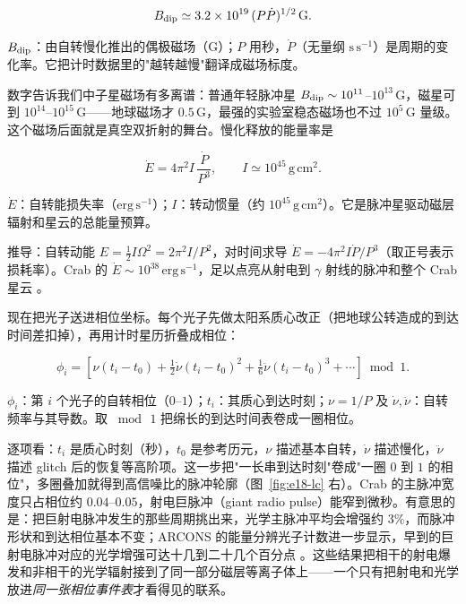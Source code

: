 \begin{equation}
  B_{\rm dip}\simeq 3.2\times10^{19}\,(P\dot P)^{1/2}\,\mathrm{G}.
  \label{eq:e18-bdip}
\end{equation}
\begin{formulaexplain}
\(B_{\rm dip}\)：由自转慢化推出的偶极磁场（\(\mathrm{G}\)）；\(P\) 用秒，\(\dot P\)（无量纲 \(\mathrm{s\,s^{-1}}\)）是周期的变化率。它把计时数据里的"越转越慢"翻译成磁场标度。
\end{formulaexplain}

数字告诉我们中子星磁场有多离谱：普通年轻脉冲星 \(B_{\rm dip}\sim10^{11}\)–\(10^{13}\,\mathrm{G}\)，磁星可到 \(10^{14}\)–\(10^{15}\,\mathrm{G}\)——地球磁场才 \(0.5\,\mathrm{G}\)，最强的实验室稳态磁场也不过 \(10^5\,\mathrm{G}\) 量级。这个磁场后面就是真空双折射的舞台。慢化释放的能量率是

\begin{equation}
  \dot E = 4\pi^2 I\,\frac{\dot P}{P^3},
  \qquad
  I\simeq10^{45}\,\mathrm{g\,cm^2}.
  \label{eq:e18-edot}
\end{equation}
\begin{formulaexplain}
\(\dot E\)：自转能损失率（\(\mathrm{erg\,s^{-1}}\)）；\(I\)：转动惯量（约 \(10^{45}\,\mathrm{g\,cm^2}\)）。它是脉冲星驱动磁层辐射和星云的总能量预算。
\end{formulaexplain}

推导：自转动能 \(E=\tfrac12 I\Omega^2=2\pi^2 I/P^2\)，对时间求导 \(\dot E=-4\pi^2 I\dot P/P^3\)（取正号表示损耗率）。Crab 的 \(\dot E\sim10^{38}\,\mathrm{erg\,s^{-1}}\)，足以点亮从射电到 \(\gamma\) 射线的脉冲和整个 Crab 星云 \citep{1984ApJ...283..279H,1992ApJ...397..187B,2001A&A...378..918K,2008ApJ...680.1378H}。

现在把光子送进相位坐标。每个光子先做太阳系质心改正（把地球公转造成的到达时间差扣掉），再用计时星历折叠成相位：

\begin{equation}
  \phi_i=
  \left[
  \nu(t_i-t_0)+\tfrac12\dot\nu(t_i-t_0)^2
  +\tfrac16\ddot\nu(t_i-t_0)^3+\cdots
  \right]\bmod 1 .
  \label{eq:e18-fold}
\end{equation}
\begin{formulaexplain}
\(\phi_i\)：第 \(i\) 个光子的自转相位（\(0\)–\(1\)）；\(t_i\)：其质心到达时刻；\(\nu=1/P\) 及 \(\dot\nu,\ddot\nu\)：自转频率与其导数。取 \(\bmod\,1\) 把绵长的到达时间表卷成一圈相位。
\end{formulaexplain}

逐项看：\(t_i\) 是质心时刻（秒），\(t_0\) 是参考历元，\(\nu\) 描述基本自转，\(\dot\nu\) 描述慢化，\(\ddot\nu\) 描述 glitch 后的恢复等高阶项。这一步把"一长串到达时刻"卷成"一圈 \(0\) 到 \(1\) 的相位"，多圈叠加就得到高信噪比的脉冲轮廓（图~\ref{fig:e18-lc} 右）。Crab 的主脉冲宽度只占相位约 \(0.04\)–\(0.05\)，射电巨脉冲（giant radio pulse）能窄到微秒。有意思的是：把巨射电脉冲发生的那些周期挑出来，光学主脉冲平均会增强约 \(3\%\)，而脉冲形状和到达相位基本不变；ARCONS 的能量分辨光子计数进一步显示，早到的巨射电脉冲对应的光学增强可达十几到二十几个百分点 \citep{2003Sci...301..493S,2013ApJ...779L..12S}。这些结果把相干的射电爆发和非相干的光学辐射接到了同一部分磁层等离子体上——一个只有把射电和光学放进\emph{同一张相位事件表}才看得见的联系。

